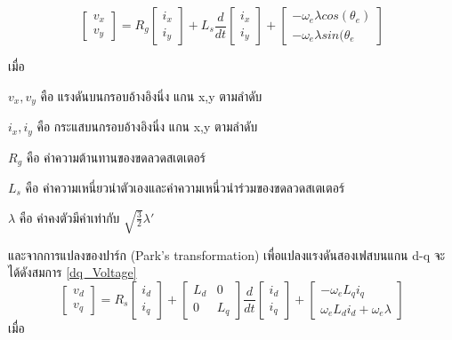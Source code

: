 \documentclass[11pt,a4paper]{article}
\begin{document}
\begin{equation}
    \begin{bmatrix}
        v_{x} \\v_{y}
    \end{bmatrix} = R_{g}
    \begin{bmatrix}
        i_{x} \\i_{y}
    \end{bmatrix} + L_{s}\frac{d}{dt}
    \begin{bmatrix}
        i_{x} \\i_{y}
    \end{bmatrix}+
    \begin{bmatrix}
        -\omega_{e} \lambda cos(\theta_{e}) \\-\omega_{e} \lambda sin(\theta_{e}
    \end{bmatrix}
\end{equation}

เมื่อ

$v_{x},v_{y}$ คือ แรงดันบนกรอบอ้างอิงนิ่ง แกน x,y ตามลำดับ

$i_{x},i_{y}$      คือ กระแสบนกรอบอ้างอิงนิ่ง แกน x,y ตามลำดับ

$R_{g}$               คือ ค่าความต้านทานของขดลวดสเตเตอร์

$L_{s}$   คือ ค่าความเหนี่ยวนำตัวเองและค่าความเหนี่วนำร่วมของขดลวดสเตเตอร์

$\lambda$ คือ ค่าคงตัวมีค่าเท่ากับ $\sqrt{\frac{3}{2}}\lambda'$

และจากการแปลงของปาร์ก (Park’s transformation) \cite{sswch3} \cite{vectorIEEE} เพื่อแปลงแรงดันสองเฟสบนแกน d-q จะได้ดังสมการ \ref{dq_Voltage}
\begin{equation}\label{dq_Voltage}
    \begin{bmatrix}
        v_{d} \\v_{q}
    \end{bmatrix} = R_{s}
    \begin{bmatrix}
        i_{d} \\i_{q}
    \end{bmatrix} +
    \begin{bmatrix}
        L_{d} & 0 \\ 0 & L_{q}
    \end{bmatrix}\frac{d}{dt}
    \begin{bmatrix}
        i_{d} \\i_{q}
    \end{bmatrix}+
    \begin{bmatrix}
        -\omega_{e} L_{q} i_{q} \\\omega_{e}L_{d}i_{d}+\omega_{e}\lambda
    \end{bmatrix}
\end{equation}
เมื่อ
\end{document}
